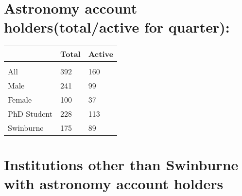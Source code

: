 \documentclass{article}%
\begin{document}
\section{Astronomy account holders(total/active for quarter): }%

%
\begin{longtabu}{X[l] X[r] X[r]}%
\textbf{}&\textbf{Total}&\textbf{Active}\\%
\hline%
&&\\%
All&392&160\\%
\hline%
Male&241&99\\%
\hline%
Female&100&37\\%
\hline%
PhD Student&228&113\\%
\hline%
Swinburne&175&89\\%
\hline%
\end{longtabu}%
\section{Institutions other than Swinburne with astronomy account holders}%
\end{document}
